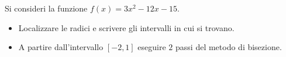 Si consideri la funzione $f(x)=3x^2-12x-15$.
\begin{itemize}
\item Localizzare le radici e
scrivere gli intervalli in cui si trovano.
 \item A partire dall'intervallo
$[-2,1]$ eseguire $2$ passi del metodo di bisezione.
\end{itemize}
